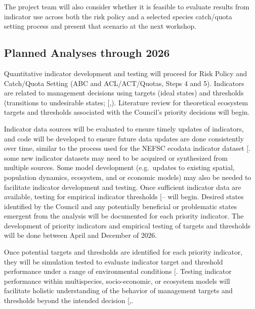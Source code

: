 \documentclass[
]{article}
\begin{document}
The project team will also consider whether it is feasible to evaluate results from indicator use across both the risk policy and a selected species catch/quota setting process and present that scenario at the next workshop.

\subsection{Planned Analyses through 2026}\label{planned-analyses-through-2026}

Quantitative indicator development and testing will proceed for Risk Policy and Catch/Quota Setting (ABC and ACL/ACT/Quotas, Steps 4 and 5). Indicators are related to management decisions using targets (ideal states) and thresholds (transitions to undesirable states; {[},\citeproc{ref-hiddink_setting_2023}{2}{]}). Literature review for theoretical ecosystem targets and thresholds associated with the Council's priority decisions will begin.

Indicator data sources will be evaluated to ensure timely updates of indicators, and code will be developed to ensure future data updates are done consistently over time, similar to the process used for the NEFSC ecodata indicator dataset {[}\citeproc{ref-bastille_improving_2021}{3}{]}. some new indicator datasets may need to be acquired or synthesized from multiple sources. Some model development (e.g.~updates to existing spatial, population dynamics, ecosystem, and or economic models) may also be needed to facilitate indicator development and testing. Once sufficient indicator data are available, testing for empirical indicator thresholds {[}--\citeproc{ref-tam_comparing_2017}{7}{]} will begin. Desired states identified by the Council and any potentially beneficial or problematic states emergent from the analysis will be documented for each priority indicator. The development of priority indicators and empirical testing of targets and thresholds will be done between April and December of 2026.

Once potential targets and thresholds are identified for each priority indicator, they will be simulation tested to evaluate indicator target and threshold performance under a range of environmental conditions {[}\citeproc{ref-fay_testing_2013}{8}{]}. Testing indicator performance within multispecies, socio-economic, or ecosystem models will facilitate holistic understanding of the behavior of management targets and thresholds beyond the intended decision {[},\citeproc{ref-tam_better_2019}{10}{]}.
\end{document}
